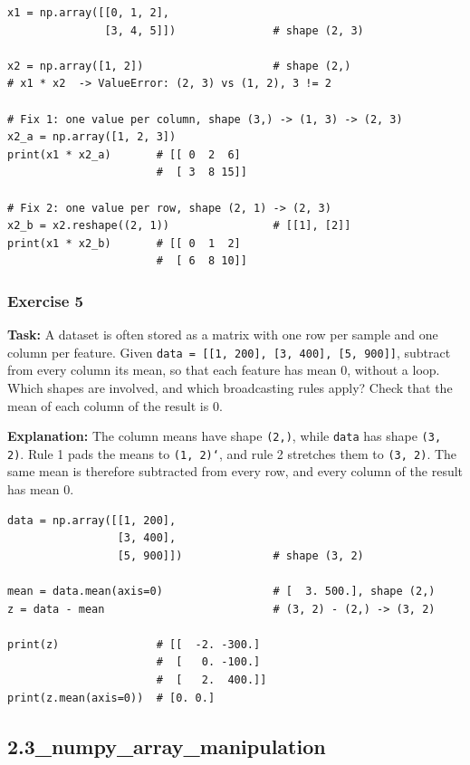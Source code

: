 \begin{lstlisting}[caption={A broadcasting error and two ways to fix it.}]
x1 = np.array([[0, 1, 2],
               [3, 4, 5]])               # shape (2, 3)

x2 = np.array([1, 2])                    # shape (2,)
# x1 * x2  -> ValueError: (2, 3) vs (1, 2), 3 != 2

# Fix 1: one value per column, shape (3,) -> (1, 3) -> (2, 3)
x2_a = np.array([1, 2, 3])
print(x1 * x2_a)       # [[ 0  2  6]
                       #  [ 3  8 15]]

# Fix 2: one value per row, shape (2, 1) -> (2, 3)
x2_b = x2.reshape((2, 1))                # [[1], [2]]
print(x1 * x2_b)       # [[ 0  1  2]
                       #  [ 6  8 10]]
\end{lstlisting}

\subsubsection{Exercise 5}
\textbf{Task:} A dataset is often stored as a matrix with one row per sample and one column per feature. Given \texttt{data = [[1, 200], [3, 400], [5, 900]]}, subtract from every column its mean, so that each feature has mean 0, without a loop. Which shapes are involved, and which broadcasting rules apply? Check that the mean of each column of the result is 0.

\textbf{Explanation:} The column means have shape \texttt{(2,)}, while \texttt{data} has shape \texttt{(3, 2)}. Rule 1 pads the means to \texttt{(1, 2)`}, and rule 2 stretches them to \texttt{(3, 2)}. The same mean is therefore subtracted from every row, and every column of the result has mean 0.

\begin{lstlisting}[caption={Centering each feature with broadcasting.}]
data = np.array([[1, 200],
                 [3, 400],
                 [5, 900]])              # shape (3, 2)

mean = data.mean(axis=0)                 # [  3. 500.], shape (2,)
z = data - mean                          # (3, 2) - (2,) -> (3, 2)

print(z)               # [[  -2. -300.]
                       #  [   0. -100.]
                       #  [   2.  400.]]
print(z.mean(axis=0))  # [0. 0.]
\end{lstlisting}

\subsection{2.3\_numpy\_array\_manipulation}

